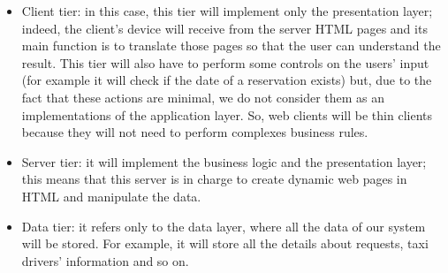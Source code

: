     \begin{itemize}
        \item Client tier: in this case, this tier will implement only the presentation layer; indeed, the client's device will receive from the server HTML pages and its main function is to translate those pages so that the user can understand the result.
        \newline 
        This tier will also have to perform some controls on the users' input (for example it will check if the date of a reservation exists) but, due to the fact that these actions are minimal, we do not consider them as an implementations of the application layer. So, web clients will be thin clients because they will not need to perform complexes business rules.
        \item Server tier: it will implement the business logic and the presentation layer; this means that this server is in charge to create dynamic web pages in HTML and manipulate the data.
        \item Data tier: it refers only to the data layer, where all the data of our system will be stored. For example, it will store all the details about requests, taxi drivers' information and so on.
    \end{itemize}